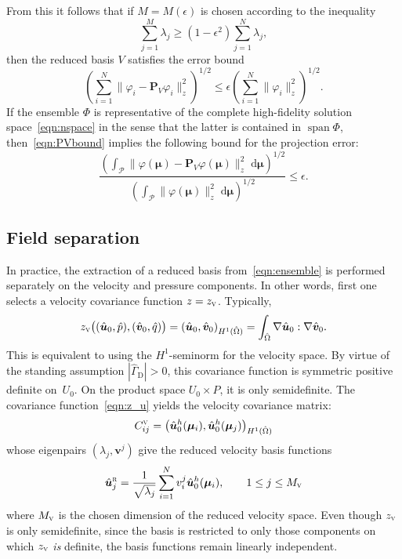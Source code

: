 \documentclass[onecolumn, twoside, a4paper, 11pt]{article}
\newcommand{\dd}{{\;\mathrm{d}}}
\begin{document}
From this it follows that if $M = M(\epsilon)$ is chosen according to the inequality
\begin{equation}
  \label{eqn:error}
  \sum_{j=1}^M \lambda_j
  \geq \left(1 - \epsilon^2\right) \sum_{j=1}^N \lambda_j,
\end{equation}
%
then the reduced basis $V$ satisfies the error bound
%
\begin{equation}
\label{eqn:PVbound}
\left( \sum_{i=1}^N \big\| \varphi_i - \bm P_V \varphi_i \big\|_z^2 \right)^{1/2}
  \leq \epsilon \left( \sum_{i=1}^N \big\| \varphi_i \big\|_z^2 \right)^{1/2}.
\end{equation}
%
If the ensemble $\Phi$ is representative of the complete high-fidelity solution space~\eqref{eqn:nspace}
in the sense that the latter is contained in $\operatorname{span}\Phi$, then~\eqref{eqn:PVbound}
implies the following bound for the projection error:
%
\begin{equation}
\label{eqn:RBerror}
\frac{\left( \int_\mathcal{P}\big\|\varphi(\bm \mu) - \bm P_V \varphi(\bm \mu)\big\|_z^2\dd\bm \mu \right)^{1/2}}
{\left( \int_\mathcal{P} \big\| \varphi(\bm \mu) \big\|_z^2 \dd\bm \mu \right)^{1/2}}
  \leq \epsilon
  .
\end{equation}
%


\subsection{Field separation}
In practice, the extraction of a reduced basis from~\eqref{eqn:ensemble} is performed separately
on the velocity and pressure components. In other words, first one selects a velocity covariance
function $z=z_\textsc{v}$. Typically,
%
\begin{equation}
\label{eqn:z_u}
z_\textsc{v}\big((\hat{\bm u}_0, \hat{p}), (\hat{\bm v}_0, \hat{q})\big) =
  \left( \hat{\bm u}_0, \hat{\bm v}_0 \right)_{H^1(\hat{\Omega})}
  = \int_{\hat{\Omega}} \nabla \hat{\bm u}_0 : \nabla \hat{\bm v}_0.
\end{equation}
%
This is equivalent to using the $H^1$-seminorm for the velocity space. By virtue of the standing
assumption $|\hat{\Gamma}_\text{D}| > 0$, this covariance function is
symmetric positive definite on~$U_0$. On the product space $U_0 \times P$, it is only semidefinite.
The covariance function~\eqref{eqn:z_u} yields the velocity covariance matrix:
%
\begin{equation}
  C^{\textsc{v}}_{ij} = \left( \hat{\bm u}^h_0(\bm{\mu}_i), \hat{\bm u}^h_0(\bm{\mu}_j) \right)_{H^1(\hat{\Omega})}
\end{equation}
%
whose eigenpairs $(\lambda_j, \bm v^{j})$ give the reduced velocity
basis functions
%
\begin{equation}
  \hat{\bm u}^\textsc{r}_j = \frac{1}{\sqrt{\lambda_j}} \sum_{i=1}^N v^{j}_i \hat{\bm u}^h_0(\bm{\mu}_i),
  \qquad 1 \leq j \leq M_\textsc{v}
\end{equation}
%
where $M_\textsc{v}$ is the chosen dimension of the reduced velocity space. Even though
$z_\textsc{v}$ is only semidefinite, since the basis is restricted to only those
components on which $z_\textsc{v}$ \emph{is} definite, the basis functions remain
linearly independent.
\end{document}
